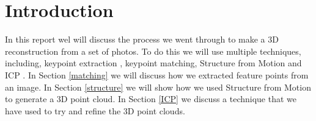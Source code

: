 \section{Introduction}
\label{intro}
In this report wel will discuss the process we went through to make a 3D reconstruction from a set of photos. To do this we will use multiple techniques, including, keypoint extraction \cite{SIFT}, keypoint matching, Structure from Motion \cite{SfM} and ICP \cite{ICP}.
In Section \ref{matching} we will discuss how we extracted feature points from an image. In Section \ref{structure} we will show how we used Structure from Motion to generate a 3D point cloud. In Section \ref{ICP} we discuss a technique that we have used to try and refine the 3D point clouds.
